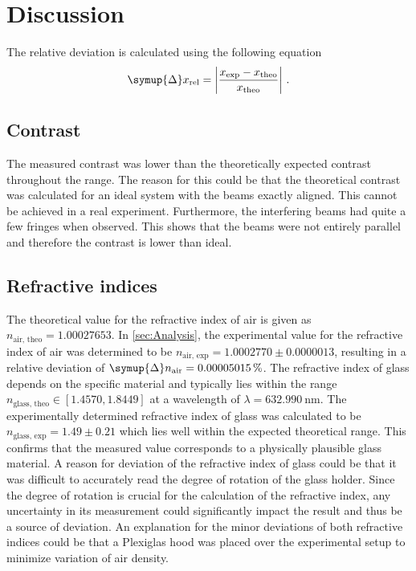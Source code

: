 \section{Discussion}
\label{sec:Discussion}
The relative deviation is calculated using the following equation
\begin{equation*}
    \symup{\Delta} x_{\text{rel}} = \left| \frac{x_{\text{exp}} - x_{{\text{theo}}}}{x_{{\text{theo}}}}\right|\,.
\end{equation*}
\subsection{Contrast}
The measured contrast was lower than the theoretically expected contrast throughout the range. The reason for this could be 
that the theoretical contrast was calculated for an ideal system with the beams exactly aligned. This cannot be achieved in 
a real experiment. Furthermore, the interfering beams had quite a few fringes when observed. This shows that the beams 
were not entirely parallel and therefore the contrast is lower than ideal. 

\subsection{Refractive indices}
The theoretical value for the refractive index of air is given as $n_{\text{air, theo}}=1.00027653$. 
In \autoref{sec:Analysis}, the experimental value for the refractive index of air was determined to be 
$n_{\text{air, exp}} = 1.0002770\pm0.0000013$, resulting in a relative deviation of $\symup{\Delta}n_{\text{air}} = 0.00005015\,\%$. 
The refractive index of 
glass depends on the specific material and typically lies within the range $n_{\text{glass, theo}}\in [1.4570, 1.8449]$ at a 
wavelength of $\lambda = \SI{632.990}{\nano\meter}$. 
The experimentally determined refractive index of glass was calculated to be $n_{\text{glass, exp}} = 1.49\pm0.21$ which lies 
well within the expected theoretical range. 
This confirms that the measured value corresponds to a physically plausible glass material.
A reason for deviation of the refractive index of glass could be that it was difficult to accurately read the degree of rotation 
of the glass holder. 
Since the degree of rotation is crucial for the calculation of the refractive index, any uncertainty in its measurement could significantly impact the result and thus be a source of deviation.
An explanation for the minor deviations of both refractive indices could be that a Plexiglas hood was placed over the 
experimental setup to minimize 
variation of air density.